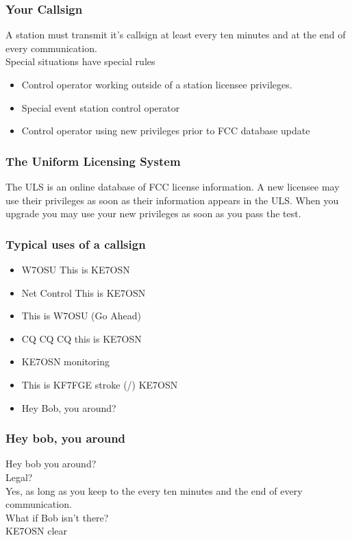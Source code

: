 \documentclass[10pt]{beamer}
\begin{document}
\begin{frame}
\frametitle{Your Callsign}
A station must transmit it's callsign at least every ten minutes and at the end of every communication.\\
Special situations have special rules\\
\begin{itemize}
\item Control operator working outside of a station licensee privileges.
\item Special event station control operator
\item Control operator using new privileges prior to FCC database update
\end{itemize}
\end{frame}

\begin{frame}
\frametitle{The Uniform Licensing System}
The ULS is an online database of FCC license information. A new licensee may use their privileges as soon as their information appears in the ULS. When you upgrade you may use your new privileges as soon as you pass the test.
\end{frame}

\begin{frame}
\frametitle{Typical uses of a callsign}
\begin{itemize}[<+->]
\item W7OSU This is KE7OSN
\item Net Control This is KE7OSN
\item This is W7OSU (Go Ahead)
\item CQ CQ CQ this is KE7OSN
\item KE7OSN monitoring
\item This is KF7FGE stroke (/) KE7OSN
\item Hey Bob, you around?
\end{itemize}
\end{frame}

\begin{frame}
\frametitle{Hey bob, you around}
Hey bob you around?\\
Legal? \\ \pause
Yes, as long as you keep to the every ten minutes and the end of every communication. \\ \pause
What if Bob isn't there? \\ \pause
KE7OSN clear
\end{frame}
\end{document}
